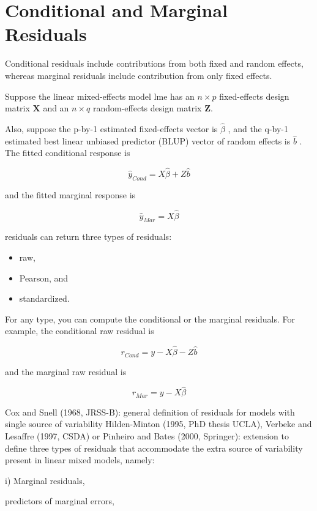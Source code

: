 \documentclass[Chap5amain.tex]{subfiles}
\begin{document}
\section{Conditional and Marginal Residuals}
Conditional residuals include contributions from both fixed and random effects, whereas marginal residuals include contribution from only fixed effects.

Suppose the linear mixed-effects model lme has an $n \times p$ fixed-effects design matrix $\boldsymbol{X}$ and an $n \times q$ random-effects design matrix $\boldsymbol{Z}$. 

Also, suppose the p-by-1 estimated fixed-effects vector is $\hat{\beta}$ , and the q-by-1 estimated best linear unbiased predictor (BLUP) 
vector of random effects is $\hat{b}$ . The fitted conditional response is

\[ \hat{y}_{Cond} = X \hat{\beta} + Z \hat{b} \]

and the fitted marginal response is


\[ \hat{y}_{Mar} = X \hat{\beta} \]

residuals can return three types of residuals:
\begin{itemize} 
\item raw, 
\item Pearson, and 
\item standardized.\end{itemize} For any type, you can compute the conditional or the marginal residuals. For example, the conditional raw residual is


\[ r_{Cond} = y - X \hat{\beta} - Z \hat{b} \]

and the marginal raw residual is



\[ r_{Mar} = y - X \hat{\beta} \]

\newpage

Cox and Snell (1968, JRSS-B): general definition of residuals for
models with single source of variability
Hilden-Minton (1995, PhD thesis UCLA), Verbeke and Lesaffre
(1997, CSDA) or Pinheiro and Bates (2000, Springer): extension to
define three types of residuals that accommodate the extra source of
variability present in linear mixed models, namely:

i) Marginal residuals, 

predictors of marginal errors, 
\end{document}
